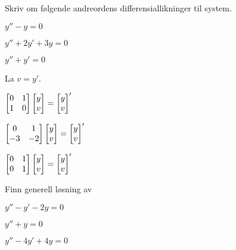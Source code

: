 
\begin{oppgave}
Skriv om følgende andreordens differensiallikninger til system.

\begin{punkt}
$y''-y=0$
\end{punkt}

\begin{punkt}
	$y''+2y'+3y=0$
\end{punkt}

\begin{punkt}
	$y''+y'=0$
\end{punkt}


\end{oppgave}

\begin{losning} La $v=y'$.
	
	\begin{punkt}$\begin{bmatrix}
		0 & 1\\
		1 & 0
		\end{bmatrix} \begin{bmatrix} y \\ v \end{bmatrix}=\begin{bmatrix} y \\ v \end{bmatrix}'
		$
	\end{punkt}
	
	\begin{punkt}$\begin{bmatrix}
		0 & 1\\
		-3 & -2
		\end{bmatrix} \begin{bmatrix} y \\ v \end{bmatrix}=\begin{bmatrix} y \\ v \end{bmatrix}'
		$
	\end{punkt}
	
	\begin{punkt}$\begin{bmatrix}
		0 & 1\\
		0 & 1
		\end{bmatrix} \begin{bmatrix} y \\ v \end{bmatrix}=\begin{bmatrix} y \\ v \end{bmatrix}'
		$
	\end{punkt}
	
\end{losning}

\begin{oppgave}
Finn generell løsning av
\begin{punkt}
	$y''-y'-2y=0$
\end{punkt}

\begin{punkt}
	$y''+y=0$
\end{punkt}

\begin{punkt}
	$y''-4y'+4y=0$
\end{punkt}

\end{oppgave}

